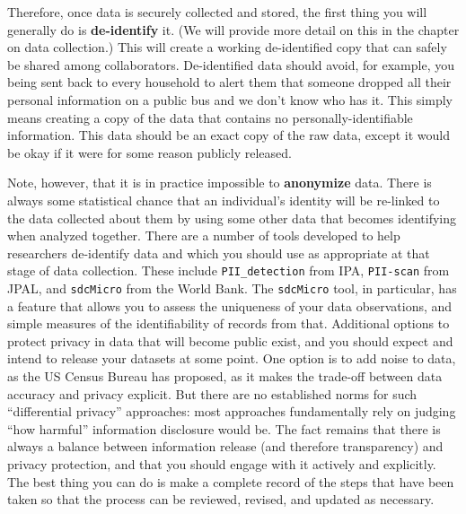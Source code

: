 Therefore, once data is securely collected and stored,
the first thing you will generally do is \textbf{de-identify} it.
(We will provide more detail on this in the chapter on data collection.)
This will create a working de-identified copy
that can safely be shared among collaborators.
De-identified data should avoid, for example,
you being sent back to every household
to alert them that someone dropped all their personal information
on a public bus and we don't know who has it.
This simply means creating a copy of the data
that contains no personally-identifiable information.
This data should be an exact copy of the raw data,
except it would be okay if it were for some reason publicly released.\cite{matthews2011data}

Note, however, that it is in practice impossible to \textbf{anonymize} data.
There is always some statistical chance that an individual's identity
will be re-linked to the data collected about them
by using some other data that becomes identifying when analyzed together.
There are a number of tools developed to help researchers de-identify data
and which you should use as appropriate at that stage of data collection.
These include \texttt{PII\_detection} from IPA,
\texttt{PII-scan} from JPAL,
and \texttt{sdcMicro} from the World Bank.
The \texttt{sdcMicro} tool, in particular, has a feature
that allows you to assess the uniqueness of your data observations,
and simple measures of the identifiability of records from that.
Additional options to protect privacy in data that will become public exist,
and you should expect and intend to release your datasets at some point.
One option is to add noise to data, as the US Census Bureau has proposed,\cite{abowd2018us}
as it makes the trade-off between data accuracy and privacy explicit.
But there are no established norms for such ``differential privacy'' approaches:
most approaches fundamentally rely on judging ``how harmful'' information disclosure would be.
The fact remains that there is always a balance between information release (and therefore transparency)
and privacy protection, and that you should engage with it actively and explicitly.
The best thing you can do is make a complete record of the steps that have been taken
so that the process can be reviewed, revised, and updated as necessary.
